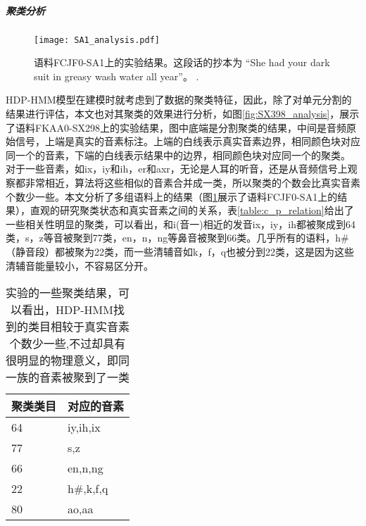 \subparagraph{聚类分析}
\begin{figure}
\texttt{[image: SA1\_analysis.pdf]} 
\vspace{-4pt}
  \caption{语料FCJF0-SA1上的实验结果。这段话的抄本为 “She had your dark suit in greasy wash water all year”。
.} \label{fig:SA1_analysis}
  \vspace{-8pt}
\end{figure}

HDP-HMM模型在建模时就考虑到了数据的聚类特征，因此，除了对单元分割的结果进行评估，本文也对其聚类的效果进行分析，如图\ref{fig:SX398_analysis}，展示了语料FKAA0-SX298上的实验结果，图中底端是分割聚类的结果，中间是音频原始信号，上端是真实的音素标注。上端的白线表示真实音素边界，相同颜色块对应同一个的音素，下端的白线表示结果中的边界，相同颜色块对应同一个的聚类。
对于一些音素，如ix，iy和ih，er和axr，无论是人耳的听音，还是从音频信号上观察都非常相近，算法将这些相似的音素合并成一类，所以聚类的个数会比真实音素个数少一些。本文分析了多组语料上的结果（图\ref{fig:SA1_analysis}展示了语料FCJF0-SA1上的结果），直观的研究聚类状态和真实音素之间的关系，表\ref{table:c_p_relation}给出了一些相关性明显的聚类，可以看出，和i(音一)相近的发音ix，iy，ih都被聚成到64类，s，z等音被聚到77类，en，n，ng等鼻音被聚到66类。几乎所有的语料，h\#（静音段）都被聚为22类，而一些清辅音如k，f，q也被分到22类，这是因为这些清辅音能量较小，不容易区分开。

\begin{table}
\vspace{4pt}
\begin{center}\small
\begin{tabular}{|l|l|}
\hline \bf 聚类类目 & \bf 对应的音素 \\ \hline
64 &  iy,ih,ix \\ \hline
77 &  s,z \\ \hline
66 &  en,n,ng \\ \hline
22 &  h\#,k,f,q \\ \hline
80 &  ao,aa \\ \hline
\end{tabular}
\end{center}
\vspace{-8pt}
\caption{实验的一些聚类结果，可以看出，HDP-HMM找到的类目相较于真实音素个数少一些,不过却具有很明显的物理意义，即同一族的音素被聚到了一类}
\vspace{-4pt}
\end{table}\label{table:c_p_relation}